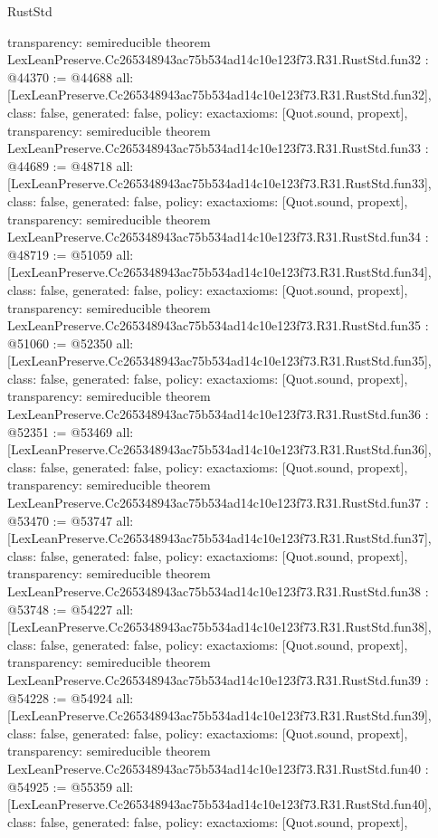 \begin{lexlean}{RustStd}
\begin{coremodule}
{  transparency: semireducible
}
theorem LexLeanPreserve.Cc265348943ac75b534ad14c10e123f73.R31.RustStd.fun32 : @44370 := @44688 {
  all: [LexLeanPreserve.Cc265348943ac75b534ad14c10e123f73.R31.RustStd.fun32],
  class: false,
  generated: false,
  policy: exact{axioms: [Quot.sound, propext]},
  transparency: semireducible
}
theorem LexLeanPreserve.Cc265348943ac75b534ad14c10e123f73.R31.RustStd.fun33 : @44689 := @48718 {
  all: [LexLeanPreserve.Cc265348943ac75b534ad14c10e123f73.R31.RustStd.fun33],
  class: false,
  generated: false,
  policy: exact{axioms: [Quot.sound, propext]},
  transparency: semireducible
}
theorem LexLeanPreserve.Cc265348943ac75b534ad14c10e123f73.R31.RustStd.fun34 : @48719 := @51059 {
  all: [LexLeanPreserve.Cc265348943ac75b534ad14c10e123f73.R31.RustStd.fun34],
  class: false,
  generated: false,
  policy: exact{axioms: [Quot.sound, propext]},
  transparency: semireducible
}
theorem LexLeanPreserve.Cc265348943ac75b534ad14c10e123f73.R31.RustStd.fun35 : @51060 := @52350 {
  all: [LexLeanPreserve.Cc265348943ac75b534ad14c10e123f73.R31.RustStd.fun35],
  class: false,
  generated: false,
  policy: exact{axioms: [Quot.sound, propext]},
  transparency: semireducible
}
theorem LexLeanPreserve.Cc265348943ac75b534ad14c10e123f73.R31.RustStd.fun36 : @52351 := @53469 {
  all: [LexLeanPreserve.Cc265348943ac75b534ad14c10e123f73.R31.RustStd.fun36],
  class: false,
  generated: false,
  policy: exact{axioms: [Quot.sound, propext]},
  transparency: semireducible
}
theorem LexLeanPreserve.Cc265348943ac75b534ad14c10e123f73.R31.RustStd.fun37 : @53470 := @53747 {
  all: [LexLeanPreserve.Cc265348943ac75b534ad14c10e123f73.R31.RustStd.fun37],
  class: false,
  generated: false,
  policy: exact{axioms: [Quot.sound, propext]},
  transparency: semireducible
}
theorem LexLeanPreserve.Cc265348943ac75b534ad14c10e123f73.R31.RustStd.fun38 : @53748 := @54227 {
  all: [LexLeanPreserve.Cc265348943ac75b534ad14c10e123f73.R31.RustStd.fun38],
  class: false,
  generated: false,
  policy: exact{axioms: [Quot.sound, propext]},
  transparency: semireducible
}
theorem LexLeanPreserve.Cc265348943ac75b534ad14c10e123f73.R31.RustStd.fun39 : @54228 := @54924 {
  all: [LexLeanPreserve.Cc265348943ac75b534ad14c10e123f73.R31.RustStd.fun39],
  class: false,
  generated: false,
  policy: exact{axioms: [Quot.sound, propext]},
  transparency: semireducible
}
theorem LexLeanPreserve.Cc265348943ac75b534ad14c10e123f73.R31.RustStd.fun40 : @54925 := @55359 {
  all: [LexLeanPreserve.Cc265348943ac75b534ad14c10e123f73.R31.RustStd.fun40],
  class: false,
  generated: false,
  policy: exact{axioms: [Quot.sound, propext]},
}
\end{coremodule}
\end{lexlean}
